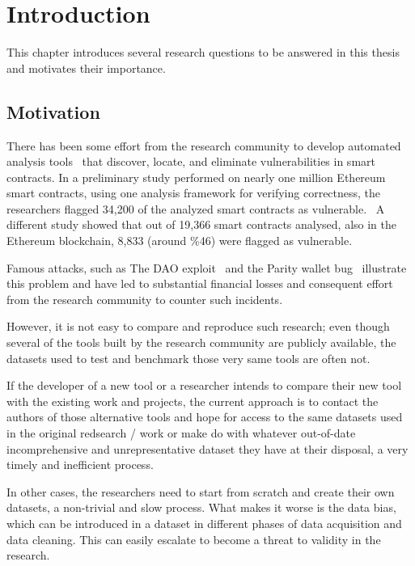 \chapter{Introduction}

  This chapter introduces several research questions to be answered in this thesis and motivates their importance.

\section{Motivation}
  There has been some effort from the research community to develop automated analysis tools~\cite{ref_tools} that discover, locate, and eliminate vulnerabilities in smart contracts.
  In a preliminary study performed on nearly one million Ethereum smart contracts, using one analysis framework for verifying correctness, the researchers flagged 34,200 of the analyzed smart contracts as vulnerable.~\cite{ref_flag1}
  A different study showed that out of 19,366 smart contracts analysed, also in the Ethereum blockchain, 8,833 (around \%46) were flagged as vulnerable.~\cite{ref_flag2}
  
  Famous attacks, such as The DAO exploit~\cite{dao} and the Parity wallet bug~\cite{ref_parity} illustrate this problem and have led to substantial financial losses and consequent effort from the research community to counter such incidents.

  However, it is not easy to compare and reproduce such research; even though several of the tools built by the research community are publicly available, the datasets used to test and benchmark those very same tools are often not.

  If the developer of a new tool or a researcher intends to compare their new tool with the existing work and projects, the current approach is to contact the authors of those alternative tools and hope for access to the same datasets used in the original redsearch / work or make do with whatever out-of-date incomprehensive and unrepresentative dataset they have at their disposal, a very timely and inefficient process.

  In other cases, the researchers need to start from scratch and create their own datasets, a non-trivial and slow process.
  What makes it worse is the data bias, which can be introduced in a dataset in different phases of data acquisition and data cleaning.
  This can easily escalate to become a threat to validity in the research.~\cite{Empirical-Evaluation-of-Smart-Contract-Testing:What-is-the-Best-Choice}

